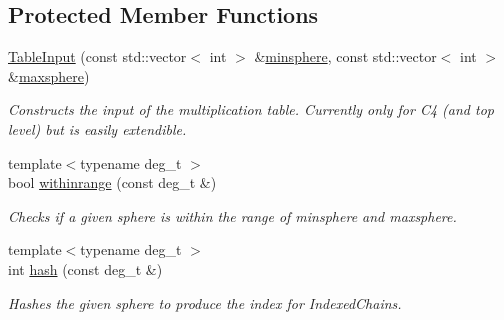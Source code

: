 \subsection*{Protected Member Functions}
\begin{DoxyCompactItemize}
\item 
\hyperlink{classMackey_1_1TableInput_a6beec147bbfcf4e03f7a11519e478aba}{Table\+Input} (const std\+::vector$<$ int $>$ \&\hyperlink{classMackey_1_1TableInput_a3f4bf3973cebe4bc2d305d111fa8b478}{minsphere}, const std\+::vector$<$ int $>$ \&\hyperlink{classMackey_1_1TableInput_a56448ebdfecb95da4c52349d4ccbf576}{maxsphere})
\begin{DoxyCompactList}\small\item\em Constructs the input of the multiplication table. Currently only for C4 (and top level) but is easily extendible. \end{DoxyCompactList}\item 
{\footnotesize template$<$typename deg\+\_\+t $>$ }\\bool \hyperlink{classMackey_1_1TableInput_a8fc6c520589273fad3e606a8a72086a8}{withinrange} (const deg\+\_\+t \&)
\begin{DoxyCompactList}\small\item\em Checks if a given sphere is within the range of minsphere and maxsphere. \end{DoxyCompactList}\item 
{\footnotesize template$<$typename deg\+\_\+t $>$ }\\int \hyperlink{classMackey_1_1TableInput_a277a59b7c30aa21e37c0ed7f187552cd}{hash} (const deg\+\_\+t \&)
\begin{DoxyCompactList}\small\item\em Hashes the given sphere to produce the index for Indexed\+Chains. \end{DoxyCompactList}\end{DoxyCompactItemize}
